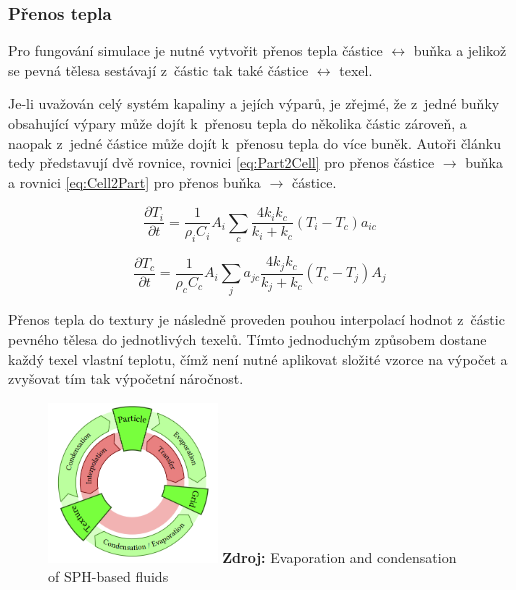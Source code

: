 \subsubsection{Přenos tepla}
Pro fungování simulace je nutné vytvořit přenos tepla částice $\leftrightarrow$ buňka a jelikož se pevná tělesa sestávají z~částic tak také částice $\leftrightarrow$ texel.

Je-li uvažován celý systém kapaliny a jejích výparů, je zřejmé, že z~jedné buňky obsahující výpary může dojít k~přenosu tepla do několika částic zároveň, a naopak z~jedné částice může dojít k~přenosu tepla do více buněk. Autoři článku tedy představují dvě rovnice, rovnici \ref{eq:Part2Cell} pro přenos částice $\rightarrow$ buňka a rovnici \ref{eq:Cell2Part} pro přenos buňka $\rightarrow$ částice.

\begin{equation}
	\frac{\partial T_i}{\partial t} = \frac{1}{\rho_i C_i} A_i \sum_c \frac{4 k_i k_c}{k_i + k_c}(T_i - T_c)a_{ic}
	\label{eq:Part2Cell}
\end{equation}

\begin{equation}
	\frac{\partial T_c}{\partial t} = \frac{1}{\rho_c C_c} A_i \sum_j a_{jc}\frac{4 k_j k_c}{k_j + k_c}(T_c - T_j)A_j
	\label{eq:Cell2Part}
\end{equation}

Přenos tepla do textury je následně proveden pouhou interpolací hodnot z~částic pevného tělesa do jednotlivých texelů. Tímto jednoduchým způsobem dostane každý texel vlastní teplotu, čímž není nutné aplikovat složité vzorce na výpočet a zvyšovat tím tak výpočetní náročnost.

\begin{figure}[hbt]
	\centering
	\captionsetup{justification=centering}
	\includegraphics[width=0.4\textwidth]{obrazky-figures/evapCycle.PNG}
	\textbf{Zdroj: } Evaporation and condensation of SPH-based fluids \cite{Evap&Cond}
	\label{fig:EvapCycle}
\end{figure}

